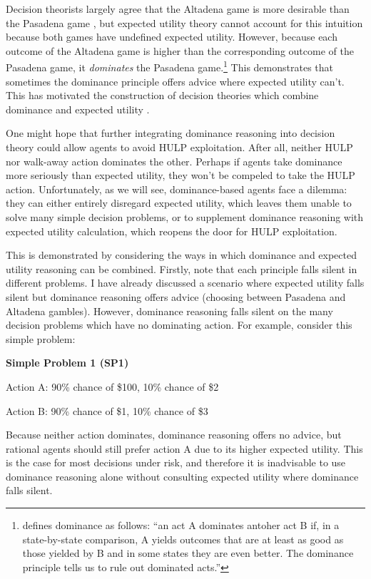 \documentclass{article}
\begin{document}
Decision theorists largely agree that the Altadena game is more desirable than the Pasadena game \citep[pg. 241]{nover2004vexing}, but expected utility theory cannot account for this intuition because both games have undefined expected utility. However, because each outcome of the Altadena game is higher than the corresponding outcome of the Pasadena game, it \textit{dominates} the Pasadena game.\footnote{\citet[pg. 9]{resnik1987choices} defines dominance as follows: ``an act A dominates antoher act B if, in a state-by-state comparison, A yields outcomes that are at least as good as those yielded by B and in some states they are even better. The dominance principle tells us to rule out dominated acts.''} This demonstrates that sometimes the dominance principle offers advice where expected utility can't. This has motivated the construction of decision theories which combine dominance and expected utility \citep{easwaran2009dominance, colyvan2008relative, colyvan2006no}.

One might hope that further integrating dominance reasoning into decision theory could allow agents to avoid HULP exploitation. After all, neither HULP nor walk-away action dominates the other. Perhaps if agents take dominance more seriously than expected utility, they won't be compeled to take the HULP action. Unfortunately, as we will see, dominance-based agents face a dilemma: they can either entirely disregard expected utility, which leaves them unable to solve many simple decision problems, or to supplement dominance reasoning with expected utility calculation, which reopens the door for HULP exploitation.

This is demonstrated by considering the ways in which dominance and expected utility reasoning can be combined. Firstly, note that each principle falls silent in different problems. I have already discussed a scenario where expected utility falls silent but dominance reasoning offers advice (choosing between Pasadena and Altadena gambles). However, dominance reasoning falls silent on the many decision problems which have no dominating action. For example, consider this simple problem:

\begin{center}
\textbf{Simple Problem 1 (SP1)}

Action A: 90\% chance of \$100, 10\% chance of \$2

Action B: 90\% chance of \$1, 10\% chance of \$3
\end{center}

Because neither action dominates, dominance reasoning offers no advice, but rational agents should still prefer action A due to its higher expected utility. This is the case for most decisions under risk, and therefore it is inadvisable to use dominance reasoning alone without consulting expected utility where dominance falls silent.
\end{document}
